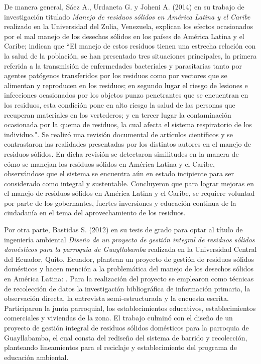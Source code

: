 De manera general, Sáez A., Urdaneta G. y Joheni A. (2014) en su trabajo de investigación titulado \textit{Manejo de residuos sólidos en América Latina y el Caribe} realizado en la Universidad del Zulia, Venezuela, explican los efectos ocasionados por el mal manejo de los desechos sólidos en los países de América Latina y el Caribe; indican que ``El manejo de estos residuos tienen una estrecha relación con la salud de la población, se han presentado tres situaciones principales, la primera referida a la transmisión de enfermedades bacteriales y parasitarias tanto por agentes patógenos transferidos por los residuos como por vectores que se alimentan y reproducen en los residuos; en segundo lugar el riesgo de lesiones e infecciones ocasionados por los objetos punzo penetrantes que se encuentran en los residuos, esta condición pone en alto riesgo la salud de las personas que recuperan materiales en los vertederos; y en tercer lugar la contaminación ocasionada por la quema de residuos, la cual afecta el sistema respiratorio de los individuo.". Se realizó una revisión documental de artículos científicos y se contrastaron las realidades presentadas por los distintos autores en el manejo de residuos sólidos. En dicha revisión se detectaron similitudes en la manera de cómo se manejan los residuos sólidos en América Latina y el Caribe, observándose que el sistema se encuentra aún en estado incipiente para ser considerado como integral y sustentable. Concluyeron que para lograr mejoras en el manejo de residuos sólidos en América Latina y el Caribe, se requiere voluntad por parte de los gobernantes, fuertes inversiones y educación continua de la ciudadanía en el tema del aprovechamiento de los residuos.

Por otra parte, Bastidas S. (2012) en su tesis de grado para optar al título de ingeniería ambiental \textit{Diseño de un proyecto de gestión integral de residuos sólidos domésticos para la parroquia de Guayllabamba} realizada en la Universidad Central del Ecuador, Quito, Ecuador, plantean un proyecto de gestión de residuos sólidos domésticos y hacen mención a la problemática del manejo de los desechos sólidos en América Latina: . Para la realización del proyecto se emplearon como técnicas de recolección de datos la investigación bibliográfica de información primaria, la observación directa, la entrevista semi-estructurada y la encuesta escrita. Participaron la junta parroquial, los establecimientos educativos, establecimientos comerciales y viviendas de la zona. El trabajo culminó con el diseño de un proyecto de gestión integral de residuos sólidos domésticos para la parroquia de Guayllabamba, el cual consta del rediseño del sistema de barrido y recolección, planteando lineamientos para el reciclaje y establecimiento del programa de educación ambiental.  

